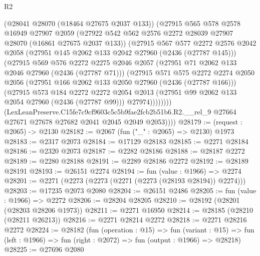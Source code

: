 \begin{lexlean}{R2}
\begin{coremodule}
                (@28041 @28070 (@18464 @27675 @2037 @133))
                (@27915
                  @565
                  @578
                  @2578
                  @16949
                  @27907
                  @2059
                  (@27922 @542 @562 @2576 @2272 @28039 @27907 @28070 (@16861 @27675 @2037 @133))
                  (@27915
                    @567
                    @577
                    @2272
                    @2576
                    @2042
                    @2058
                    (@27951 @145 @2062 @133 @2042 @27960 (@2436 (@27787 @145)))
                    (@27915
                      @569
                      @576
                      @2272
                      @2275
                      @2046
                      @2057
                      (@27951 @71 @2062 @133 @2046 @27960 (@2436 (@27787 @71)))
                      (@27915
                        @571
                        @575
                        @2272
                        @2274
                        @2050
                        @2056
                        (@27951 @166 @2062 @133 @2050 @27960 (@2436 (@27787 @166)))
                        (@27915
                          @573
                          @184
                          @2272
                          @2272
                          @2054
                          @2013
                          (@27951 @99 @2062 @133 @2054 @27960 (@2436 (@27787 @99)))
                          @27974))))))))
          (LexLeanPreserve.C15fe7c9cf9603c5c5b9fae2fcb2b51b6.R2.__rel_9
            @27664
            @27671
            @27678
            @27682
            @2041
            @2045
            @2049
            @2053))))
@28179 := (request : @2065) -> @2130
@28182 := @2067 (fun ("_" : @2065) => @2130) @1973
@28183 := @2317 @2073
@28184 := @17129 @28183
@28185 := @2271 @28184
@28186 := @2320 @2073
@28187 := @2282 @28186
@28188 := @28187 @2272
@28189 := @2280 @28188
@28191 := @2289 @28186 @2272
@28192 := @28189 @28191
@28193 := @26151 @2274
@28194 := fun (value : @1966) => @2274
@28201 := @2271 (@2273 (@2273 (@2271 (@2273 (@28193 @28194)) @2274)))
@28203 := @17235 @2073 @2080
@28204 := @26151 @2486
@28205 := fun (value : @1966) => @2272
@28206 := @28204 @28205
@28210 := @28192 (@28201 (@28203 @28206 @1973))
@28211 := @2271 @16950
@28214 := @28185 (@28210 (@28211 @26213))
@28216 := @2271 @28214 @2272
@28218 := @2271 @28216 @2272
@28224 := @28182
    (fun (operation : @15) =>
    fun (variant : @15) =>
    fun (left : @1966) => fun (right : @2072) => fun (output : @1966) => @28218)
@28225 := @27696 @2080

\end{coremodule}
\end{lexlean}
